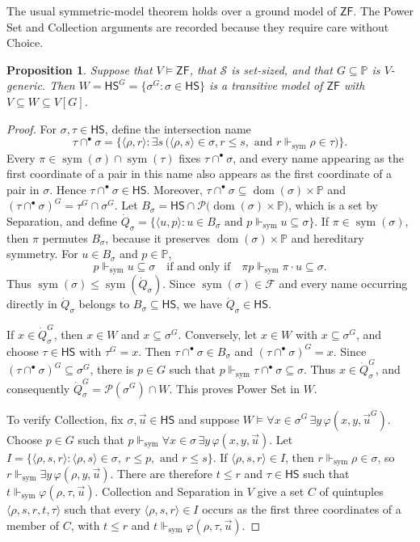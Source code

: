\documentclass[11pt,a4paper]{amsart}
\newcommand{\ZF}{\mathsf{ZF}}
\newcommand{\HS}{\mathsf{HS}}
\newcommand{\sym}{\operatorname{sym}}
\newcommand{\forcesS}{\Vdash_{\mathrm{sym}}}
\theoremstyle{plain}
\newtheorem{proposition}[theorem]{Proposition}
\theoremstyle{definition}
\theoremstyle{remark}
\begin{document}
The usual symmetric-model theorem holds over a ground model of $\ZF$.  The Power Set and Collection arguments are recorded because they require care without Choice.

\begin{proposition}\label{prop:symmetric-ZF}
Suppose that $V\models\ZF$, that $\mathscr S$ is set-sized, and that $G\subseteq\mathbb P$ is $V$-generic.  Then
$W=\HS^G=\{\sigma^G:\sigma\in\HS\}$ is a transitive model of $\ZF$ with $V\subseteq W\subseteq V[G]$.
\end{proposition}

\begin{proof}
For $\sigma,\tau\in\HS$, define the intersection name
\[
\tau\cap^\bullet\sigma=\bigl\{\langle\rho,r\rangle:\exists s\,\bigl(\langle\rho,s\rangle\in\sigma, r\leq s,
\text{ and }r\forcesS\rho\in\tau\bigr)\bigr\}.
\]
Every $\pi\in\sym(\sigma)\cap\sym(\tau)$ fixes $\tau\cap^\bullet\sigma$, and every name appearing as the first coordinate of a pair in this name also appears as the first coordinate of a pair in $\sigma$.  Hence $\tau\cap^\bullet\sigma\in\HS$.  Moreover, $\tau\cap^\bullet\sigma\subseteq \operatorname{dom}(\sigma)\times\mathbb P$ and $(\tau\cap^\bullet\sigma)^G=\tau^G\cap\sigma^G$.  Let $B_\sigma=\HS\cap\mathcal P\bigl(\operatorname{dom}(\sigma)\times\mathbb P\bigr)$, which is a set by Separation, and define $\dot Q_\sigma=\bigl\{\langle u,p\rangle:u\in B_\sigma\text{ and }p\forcesS u\subseteq\sigma\bigr\}$.
If $\pi\in\sym(\sigma)$, then $\pi$ permutes $B_\sigma$, because it preserves $\operatorname{dom}(\sigma)\times\mathbb P$ and hereditary symmetry.  For $u\in B_\sigma$ and $p\in\mathbb P$,
\[
p\forcesS u\subseteq\sigma
\quad\text{if and only if}\quad
\pi p\forcesS\pi\cdot u\subseteq\sigma.
\]
Thus $\sym(\sigma)\leq\sym(\dot Q_\sigma)$.  Since $\sym(\sigma)\in\mathcal F$ and every name occurring directly in $\dot Q_\sigma$ belongs to $B_\sigma\subseteq\HS$, we have $\dot Q_\sigma\in\HS$.

If $x\in\dot Q_\sigma^G$, then $x\in W$ and $x\subseteq\sigma^G$.  Conversely, let $x\in W$ with $x\subseteq\sigma^G$, and choose $\tau\in\HS$ with $\tau^G=x$.  Then $\tau\cap^\bullet\sigma\in B_\sigma$ and $(\tau\cap^\bullet\sigma)^G=x$.  Since $(\tau\cap^\bullet\sigma)^G\subseteq\sigma^G$, there is $p\in G$ such that $p\forcesS\tau\cap^\bullet\sigma\subseteq\sigma$.  Thus $x\in\dot Q_\sigma^G$, and consequently $\dot Q_\sigma^G=\mathcal P(\sigma^G)\cap W$.
This proves Power Set in $W$.

To verify Collection, fix $\sigma,\vec u\in\HS$ and suppose $W\models\forall x\in\sigma^G\,\exists y\,\varphi(x,y,\vec u^G)$.  Choose $p\in G$ such that $p\forcesS\forall x\in\sigma\,\exists y\,\varphi(x,y,\vec u)$.  Let $I=\bigl\{\langle\rho,s,r\rangle:\langle\rho,s\rangle\in\sigma,\ r\leq p,\text{ and }r\leq s\bigr\}$.  If $\langle\rho,s,r\rangle\in I$, then $r\forcesS\rho\in\sigma$, so $r\forcesS\exists y\,\varphi(\rho,y,\vec u)$.  There are therefore $t\leq r$ and $\tau\in\HS$ such that $t\forcesS\varphi(\rho,\tau,\vec u)$.  Collection and Separation in $V$ give a set $C$ of quintuples $\langle\rho,s,r,t,\tau\rangle$ such that every $\langle\rho,s,r\rangle\in I$ occurs as the first three coordinates of a member of $C$, with $t\leq r$ and $t\forcesS\varphi(\rho,\tau,\vec u)$.


\end{proof}
\end{document}
